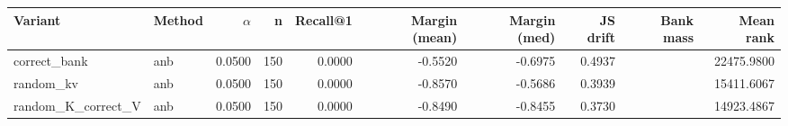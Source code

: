 \begin{tabular}{l l r r r r r r r r}
\toprule
Variant & Method & $\alpha$ & n & Recall@1 & Margin (mean) & Margin (med) & JS drift & Bank mass & Mean rank \\
\midrule
correct\_bank & anb & 0.0500 & 150 & 0.0000 & -0.5520 & -0.6975 & 0.4937 &  & 22475.9800 \\
random\_kv & anb & 0.0500 & 150 & 0.0000 & -0.8570 & -0.5686 & 0.3939 &  & 15411.6067 \\
random\_K\_correct\_V & anb & 0.0500 & 150 & 0.0000 & -0.8490 & -0.8455 & 0.3730 &  & 14923.4867 \\
\bottomrule
\end{tabular}
